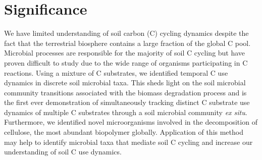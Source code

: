 \section{Significance} 
We have limited understanding of soil carbon (C) cycling dynamics despite the fact that the terrestrial biosphere contains a large fraction of the global C pool. Microbial processes are responsible for the majority of soil C cycling but have proven difficult to study due to the wide range of organisms participating in C reactions. Using a mixture of C substrates, we identified temporal C use dynamics in discrete soil microbial taxa. This sheds light on the soil microbial community transitions associated with the biomass degradation process and is the first ever demonstration of simultaneously tracking distinct C substrate use dynamics of multiple C substrates through a soil microbial community \textit{ex situ}. Furthermore, we identified novel microorganisms involved in the decomposition of cellulose, the most abundant biopolymer globally. Application of this method may help to identify microbial taxa that mediate soil C cycling and increase our understanding of soil C use dynamics. 